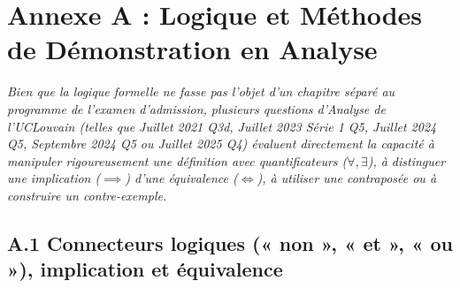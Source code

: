\chapter*{Annexe A : Logique et Méthodes de Démonstration en Analyse}

\emph{Bien que la logique formelle ne fasse pas l'objet d'un chapitre séparé au programme de l'examen d'admission, plusieurs questions d'Analyse de l'UCLouvain (telles que Juillet 2021 Q3d, Juillet 2023 Série 1 Q5, Juillet 2024 Q5, Septembre 2024 Q5 ou Juillet 2025 Q4) évaluent directement la capacité à manipuler rigoureusement une définition avec quantificateurs ($\forall, \exists$), à distinguer une implication ($\implies$) d'une équivalence ($\iff$), à utiliser une contraposée ou à construire un contre-exemple.}

\section*{A.1 Connecteurs logiques (« non », « et », « ou »), implication et équivalence}

